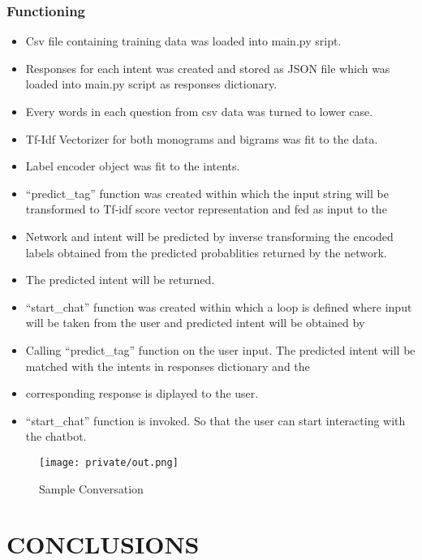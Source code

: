\documentclass[14pt]{extarticle}
\begin{document}
\subsubsection{Functioning}
\begin{itemize}
    \item Csv file containing training data was loaded into main.py sript.
    \item Responses for each intent was created and stored as JSON file which was loaded into main.py script as responses dictionary.
    \item Every words in each question from csv data was turned to lower case.
    \item Tf-Idf Vectorizer for both monograms and bigrams was fit to the data.
    \item Label encoder object was fit to the intents.
    \item “predict\_tag” function was created within which the input string will be transformed to Tf-idf score vector representation and fed as input to the
    \item Network and intent will be predicted by inverse transforming the encoded labels obtained from the predicted probablities returned by the network.
    \item The predicted intent will be returned.
    \item “start\_chat” function was created within which a loop is defined where input will be taken from the user and predicted intent will be obtained by
    \item Calling “predict\_tag” function on the user input. The predicted intent will be matched with the intents in responses dictionary and the
    \item corresponding response is diplayed to the user.
    \item “start\_chat” function is invoked. So that the user can start interacting with the chatbot.
\end{itemize}


\begin{figure}[!htb]
    \begin{center}
        \texttt{[image: private/out.png]}
    \end{center}
    \caption{Sample Conversation}
\end{figure}
\vspace*{10em}

\newpage
\section{CONCLUSIONS}
\end{document}
